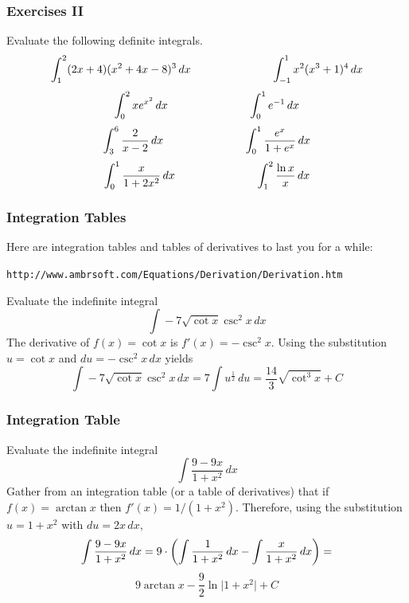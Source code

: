 \documentclass[xcolor=dvipsnames]{beamer}
\begin{document}
\begin{frame}
  \frametitle{Exercises II}
Evaluate the following definite integrals.
\begin{equation}
  \label{eq:aigighau}
  \int_{1}^{2}(2x+4)(x^{2}+4x-8)^{3}\,dx\hspace{1in}\int_{-1}^{1}x^{2}(x^{3}+1)^{4}\,dx\notag
\end{equation}
\begin{equation}
  \label{eq:omixughu}
  \int_{0}^{2}xe^{x^{2}}\,dx\hspace{1in}\int_{0}^{1}e^{-1}\,dx\notag
\end{equation}
\begin{equation}
  \label{eq:baemixeg}
  \int_{3}^{6}\frac{2}{x-2}\,dx\hspace{1in}\int_{0}^{1}\frac{e^{x}}{1+e^{x}}\,dx\notag
\end{equation}
\begin{equation}
  \label{eq:aeteepah}
  \int_{0}^{1}\frac{x}{1+2x^{2}}\,dx\hspace{1in}\int_{1}^{2}\frac{\ln{}x}{x}\,dx\notag
\end{equation}
\end{frame}

\begin{frame}
  \frametitle{Integration Tables}
  Here are integration tables and tables of derivatives to last you
  for a while:
\begin{alltt}
\small
http://www.ambrsoft.com/Equations/Derivation/Derivation.htm
\end{alltt}

 Evaluate the indefinite integral
\begin{equation}
  \label{eq:eewuquex}
  \int{}-7\sqrt{\cot{}x}\csc^{2}x\,dx
\end{equation}
The derivative of $f(x)=\cot{}x$ is $f'(x)=-\csc^{2}x$. Using the
substitution $u=\cot{}x$ and $du=-\csc^{2}x\,dx$ yields
\begin{equation}
  \label{eq:qualaiqu}
  \int{}-7\sqrt{\cot{}x}\csc^{2}x\,dx=7\int{}u^{\frac{1}{2}}\,du=\frac{14}{3}\sqrt{\cot^{3}x}+C
\end{equation}
\end{frame}

\begin{frame}
  \frametitle{Integration Table}
   Evaluate the indefinite integral
  \begin{equation}
    \label{eq:xohphohh}
    \int{}\frac{9-9x}{1+x^{2}}\,dx
  \end{equation}
Gather from an integration table (or a table of derivatives) that if
$f(x)=\arctan{}x$ then $f'(x)=1/(1+x^{2})$. Therefore, using the
substitution $u=1+x^{2}$ with $du=2x\,dx$,
\begin{equation}
  \label{eq:mixausho}
  \int{}\frac{9-9x}{1+x^{2}}\,dx=9\cdot\left(\int\frac{1}{1+x^{2}}\,dx-\int\frac{x}{1+x^{2}}\,dx\right)=\notag
\end{equation}
\begin{equation}
  \label{eq:ohleseej}
  9\arctan{}x-\frac{9}{2}\ln\vert{}1+x^{2}\vert{}+C
\end{equation}
\end{frame}
\end{document}
